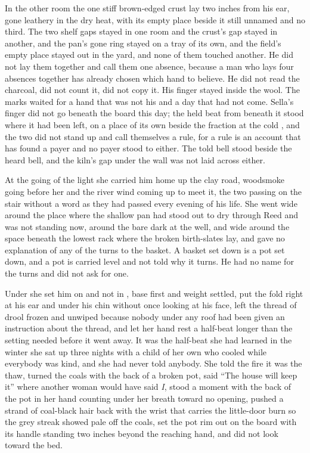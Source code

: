 In the other room the one stiff brown-edged crust lay two inches from his ear, gone leathery in the dry heat, with its empty place beside it still unnamed and no third. The two shelf gaps stayed in one room and the crust’s gap stayed in another, and the pan’s gone ring stayed on a tray of its own, and the field’s empty place stayed out in the yard, and none of them touched another. He did not lay them together and call them one absence, because a man who lays four absences together has already chosen which hand to believe. He did not read the charcoal, did not count it, did not copy it. His finger stayed inside the wool. The marks waited for a hand that was not his and a day that had not come. Sella’s finger did not go beneath the board this day; the held beat from beneath it stood where it had been left, on a place of its own beside the fraction at the cold , and the two did not stand up and call themselves a rule, for a rule is an account that has found a payer and no payer stood to either. The told bell stood beside the heard bell, and the kiln’s gap under the wall was not laid across either.

\scenebreak

At the going of the light she carried him home up the clay road, woodsmoke going before her and the river wind coming up to meet it, the two passing on the stair without a word as they had passed every evening of his life. She went wide around the place where the shallow pan had stood out to dry through Reed and was not standing now, around the bare dark  at the well, and wide around the space beneath the lowest rack where the broken birth-slates lay, and gave no explanation of any of the turns to the basket. A basket set down is a pot set down, and a pot is carried level and not told why it turns. He had no name for the turns and did not ask for one.

Under  she set him on  and not in , base first and weight settled, put the fold right at his ear and under his chin without once looking at his face, left the thread of drool frozen and unwiped because nobody under any roof had been given an instruction about the thread, and let her hand rest a half-beat longer than the setting needed before it went away. It was the half-beat she had learned in the winter she sat up three nights with a child of her own who cooled while everybody was kind, and she had never told anybody. She told the fire it was the thaw, turned the coals with the back of a broken pot, said “The house will keep it” where another woman would have said \emph{I}, stood a moment with the back of the pot in her hand counting under her breath toward no opening, pushed a strand of coal-black hair back with the wrist that carries the little-door burn so the grey streak showed pale off the coals, set the pot rim out on the board with its handle standing two inches beyond the reaching hand, and did not look toward the bed.

